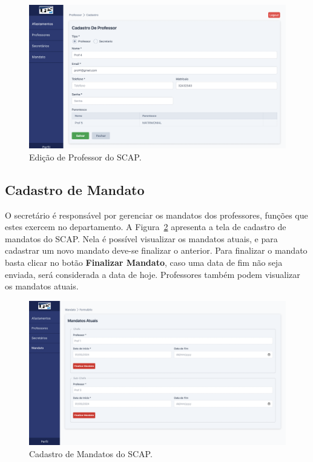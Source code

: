 \begin{figure}[h!]
    \centering
    \includegraphics[width=\textwidth]{figuras/prints-app/fig-perfil.png}
    \caption{Edição de Professor do SCAP.}
    \label{fig-editar-professor}
\end{figure}


\subsection{Cadastro de Mandato}
\label{subsec-projeto-cadastro-mandato}

O secretário é responsável por gerenciar os mandatos dos professores, funções que estes exercem
no departamento. A Figura~\ref{fig-mandato} apresenta a tela de cadastro de mandatos do SCAP.
Nela é possível visualizar os mandatos atuais, e para cadastrar um novo mandato deve-se finalizar o anterior.
Para finalizar o mandato basta clicar no botão \textbf{Finalizar Mandato}, caso uma data de fim não seja enviada,
será considerada a data de hoje. Professores também podem visualizar os mandatos atuais. 

\begin{figure}[h!]
    \centering
    \includegraphics[width=\textwidth]{figuras/prints-app/fig-mandato-visao-secretario.png}
    \caption{Cadastro de Mandatos do SCAP.}
    \label{fig-mandato}
\end{figure}